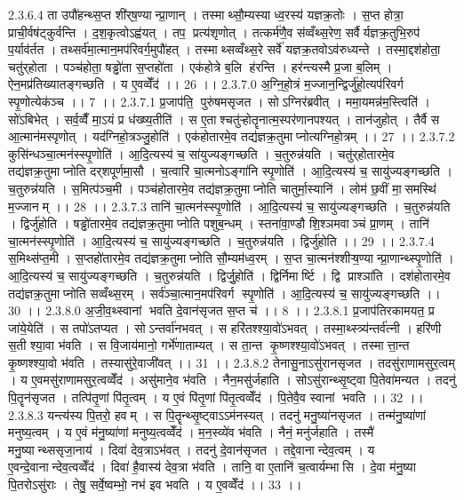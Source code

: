 2.3.6.4
ता उपौ॑हन्थ्स॒प्त शी॑र्‌ष॒ण्यान्प्रा॒णान् । तस्माथ्सौ॒म्यस्याध्व॒रस्य॑ यज्ञक्र॒तोः । स॒प्त होत्रा॒ प्राची॒र्वष॑ट्कुर्वन्ति । द॒श॒कृत्वोऽह्व॑यत् । तप॒ प्रत्य॑शृणोत् । तत्कर्म॑णै॒व स॑व्वँथ्स॒रेण॒ सर्वैर्यज्ञक्र॒तुभि॒रुप॑ प॒र्याव॑र्तत । तथ्सर्व॑मा॒त्मान॒मप॑रिवर्ग॒मुपौ॑हत् । तस्माथ्सव्वँथ्स॒रे सर्वे॑ यज्ञक्र॒तवोऽव॑रुध्यन्ते । तस्मा॒द्दश॑होता॒ चतु॑र्‌होता । पञ्च॑होता॒ षड्ढो॑ता स॒प्तहो॑ता । एक॑होत्रे ब॒लि ह॑रन्ति । हर॑न्त्यस्मै प्र॒जा ब॒लिम् । ऐन॒मप्र॑तिख्यातङ्गच्छति । य ए॒वव्वेँद॑ ।। 26 ।।
2.3.7.0
अ॒ग्नि॒हो॒त्रं म॒ज्जान॒न्द्विर्जु॑हो॒त्यप॑रिवर्ग स्पृ॒णोत्येक॑ञ्च ।। 7 ।।
2.3.7.1
प्र॒जाप॑ति॒ पुरु॑षमसृजत । सोऽग्निर॑ब्रवीत् । ममा॒यमन्न॑म॒स्त्विति॑ । सो॑ऽबिभेत् । सर्व॒व्वैँ मा॒ऽयं प्र ध॑ख्ष्य॒तीति॑ । स ए॒ताश्चतु॑ऱ्होतॄनात्म॒स्पर॑णानपश्यत् । तान॑जुहोत् । तैर्वै स आ॒त्मान॑मस्पृणोत् । यद॑ग्निहो॒त्रञ्जु॒होति॑ । एक॑होतारमे॒व तद्य॑ज्ञक्र॒तुमाप्नोत्यग्निहो॒त्रम् ।। 27 ।।
2.3.7.2
कुसि॑न्धञ्चा॒त्मन॑स्स्पृ॒णोति॑ । आ॒दि॒त्यस्य॑ च॒ सा॑युज्यङ्गच्छति । च॒तुरुन्न॑यति । चतु॑र्‌होतारमे॒व तद्य॑ज्ञक्र॒तुमाप्नोति दर्‌शपूर्णमा॒सौ । च॒त्वारि॑ चा॒त्मनोऽङ्गा॑नि स्पृ॒णोति॑ । आ॒दि॒त्यस्य॑ च॒ सायु॑ज्यङ्गच्छति । च॒तुरुन्न॑यति । स॒मित्प॑ञ्च॒मी । पञ्च॑होतारमे॒व तद्य॑ज्ञक्र॒तुमाप्नोति चातुर्मा॒स्यानि॑ । लोम॑ छ॒वीं मा॒॒समस्थि॑ म॒ज्जानम् ।। 28 ।।
2.3.7.3
तानि॑ चा॒त्मन॑स्स्पृ॒णोति॑ । आ॒दि॒त्यस्य॑ च॒ सायु॑ज्यङ्गच्छति । च॒तुरुन्न॑यति । द्विर्जु॑होति । षड्ढो॑तारमे॒व तद्य॑ज्ञक्र॒तुमाप्नोति पशुब॒न्धम् । स्तना॑वा॒ण्डौ शि॒श्ञमवाञ्चं प्रा॒णम् । तानि॑ चा॒त्मन॑स्स्पृ॒णोति॑ । आ॒दि॒त्यस्य॑ च॒ सायु॑ज्यङ्गच्छति । च॒तुरुन्न॑यति । द्विर्जु॑होति ।। 29 ।।
2.3.7.4
स॒मिथ्स॑प्त॒मी । स॒प्तहो॑तारमे॒व तद्य॑ज्ञक्र॒तुमाप्नोति सौ॒म्यम॑ध्व॒रम् । स॒प्त चा॒त्मन॑श्शीऱ्ष॒ण्यान्प्रा॒णान्थ्स्पृ॒णोति॑ । आ॒दि॒त्यस्य॑ च॒ सायु॑ज्यङ्गच्छति । च॒तुरुन्न॑यति । द्विर्जु॒होति॑ । द्विर्निमार्ष्टि । द्वि प्राश्ञा॑ति । दश॑होतारमे॒व तद्य॑ज्ञक्र॒तुमाप्नोति सव्वँथ्स॒रम् । सर्व॑ञ्चा॒त्मान॒मप॑रिवर्ग स्पृ॒णोति॑ । आ॒दि॒त्यस्य॑ च॒ सायु॑ज्यङ्गच्छति ।। 30 ।।
2.3.8.0
अ॒जी॒व॒थ्स्वानां भवति दे॒वान॑सृजत स॒प्त च॑ ।। 8 ।।
2.3.8.1
प्र॒जाप॑तिरकामयत॒ प्र जा॑ये॒येति॑ । स तपो॑ऽतप्यत । सोऽन्तर्वा॑नभवत् । स हरि॑तश्श्या॒वो॑ऽभवत् । तस्मा॒थ्स्त्र्य॑न्तर्व॑त्नी । हरि॑णी स॒ती श्या॒वा भ॑वति । स वि॒जाय॑मानो॒ गर्भे॑णाताम्यत् । स ता॒न्त कृ॒ष्णश्श्या॒वो॑ऽभवत् । तस्मात्ता॒न्त कृ॒ष्णश्श्या॒वो भ॑वति । तस्यासु॑रे॒वाजी॑वत् ।। 31 ।।
2.3.8.2
तेनासु॒नाऽसु॑रानसृजत । तदसु॑राणामसुर॒त्वम् । य ए॒वमसु॑राणामसुर॒त्वव्वेँद॑ । असु॑माने॒व भ॑वति । नैन॒मसु॑र्जहाति । सोऽसु॑रान्थ्सृ॒ष्ट्वा पि॒तेवा॑मन्यत । तदनु॑ पि॒तॄन॑सृजत । तत्पि॑तृ॒णां पि॑तृ॒त्वम् । य ए॒वं पि॑तृ॒णां पि॑तृ॒त्वव्वेँद॑ । पि॒तेवै॒व स्वानां भवति ।। 32 ।।
2.3.8.3
यन्त्य॑स्य पि॒तरो॒ हवम् । स पि॒तॄन्थ्सृ॒ष्ट्वाऽऽम॑नस्यत् । तदनु॑ मनु॒ष्या॑नसृजत । तन्म॑नु॒ष्या॑णां मनुष्य॒त्वम् । य ए॒वं म॑नु॒ष्या॑णां मनुष्य॒त्वव्वेँद॑ । म॒न॒स्व्ये॑व भ॑वति । नैनं॒ मनु॑र्जहाति । तस्मै॑ मनु॒ष्यान्थ्ससृजा॒नाय॑ । दिवा॑ देव॒त्राऽभ॑वत् । तदनु॑ दे॒वान॑सृजत । तद्दे॒वानान्देव॒त्वम् । य ए॒वन्दे॒वानान्देव॒त्वव्वेँद॑ । दिवा॑ है॒वास्य॑ देव॒त्रा भ॑वति । तानि॒ वा ए॒तानि॑ च॒त्वार्यम्भा॑सि । दे॒वा म॑नु॒ष्या पि॒तरोऽसु॑राः । तेषु॒ सर्वे॒ष्वम्भो॒ नभ॑ इव भवति । य ए॒वव्वेँद॑ ।। 33 ।।
